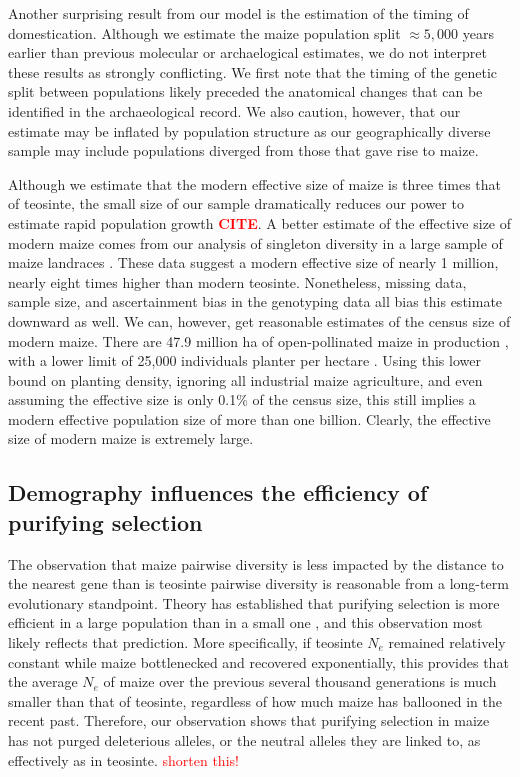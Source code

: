 \documentclass{pnastwo}
\newcommand{\jri}[1]{\textcolor{red}{\scriptsize #1}}
\newcommand{\citex}{\textcolor{red}{\bf CITE}}
\begin{document}
\begin{article}
Another surprising result from our model is the estimation of the timing of domestication.
Although we estimate the maize population split $\approx 5,000$ years earlier than previous molecular \cite{matsuoka2002} or archaelogical \cite{piperno2009starch} estimates, we do not interpret these results as strongly conflicting.
We first note that the timing of the genetic split between populations likely preceded the anatomical changes that can be identified in the archaeological record. 
We also caution, however, that our estimate may be inflated by population structure as our geographically diverse sample may include populations diverged from those that gave rise to maize.

Although we estimate that the modern effective size of maize is three times that of teosinte, the small size of our sample dramatically reduces our power to estimate rapid population growth \citex.  
A better estimate of the effective size of modern maize comes from our analysis of singleton diversity in a large sample of maize landraces \cite{Hearne2015}.
These data suggest a modern effective size of nearly 1 million, nearly eight times higher than modern teosinte.
Nonetheless, missing data, sample size, and ascertainment bias in the genotyping data all bias this estimate downward as well.
We can, however, get reasonable estimates of the census size of modern maize.
There are 47.9 million ha of open-pollinated maize in production \cite{cimmyt1999}, with a lower limit of 25,000 individuals planter per hectare \cite{baden2001culture}.
Using this lower bound on planting density, ignoring all industrial maize agriculture, and even assuming the effective size is only 0.1\% of the census size, this still implies a modern effective population size of more than one billion.
Clearly, the effective size of modern maize is extremely large.

\subsection{Demography influences the efficiency of purifying selection}
The observation that maize pairwise diversity is less impacted by the distance to the nearest gene than is teosinte pairwise diversity is reasonable from a long-term evolutionary standpoint. Theory has established that purifying selection is more efficient in a large population than in a small one \cite{kimura1984}, and this observation most likely reflects that prediction. More specifically, if teosinte $N_e$ remained relatively constant while maize bottlenecked and recovered exponentially, this provides that the average $N_e$ of maize over the previous several thousand generations is much smaller than that of teosinte, regardless of how much maize has ballooned in the recent past. Therefore, our observation shows that purifying selection in maize has not purged deleterious alleles, or the neutral alleles they are linked to, as effectively as in teosinte. \jri{shorten this!}


\end{article}
\end{document}
